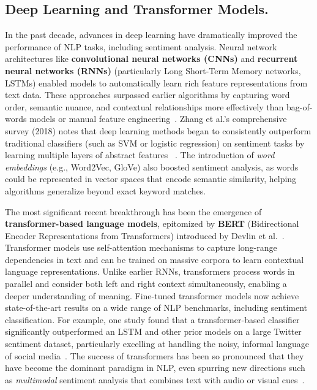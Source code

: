 \documentclass[12pt]{article}
\begin{document}
\subsection{Deep Learning and Transformer Models.}
In the past decade, advances in deep learning have dramatically improved the performance of NLP tasks,
including sentiment analysis. Neural network architectures like \textbf{convolutional neural networks (CNNs)}
and \textbf{recurrent neural networks (RNNs)} (particularly Long Short-Term Memory networks, LSTMs) enabled
models to automatically learn rich feature representations from text data. These approaches surpassed earlier
algorithms by capturing word order, semantic nuance, and contextual relationships more effectively than
bag-of-words models or manual feature engineering~\cite{10.1002/widm.1253}. Zhang et al.'s comprehensive
survey (2018) notes that deep learning methods began to consistently outperform traditional classifiers (such
as SVM or logistic regression) on sentiment tasks by learning multiple layers of abstract features~
\cite{10.1002/widm.1253}. The introduction of \textit{word embeddings} (e.g., Word2Vec, GloVe) also boosted
sentiment analysis, as words could be represented in vector spaces that encode semantic similarity, helping
algorithms generalize beyond exact keyword matches.

The most significant recent breakthrough has been the emergence of \textbf{transformer-based language models},
epitomized by \textbf{BERT} (Bidirectional Encoder Representations from Transformers) introduced by Devlin et
al.~\cite{devlin-etal-2019-bert}. Transformer models use self-attention mechanisms to capture long-range
dependencies in text and can be trained on massive corpora to learn contextual language representations.
Unlike earlier RNNs, transformers process words in parallel and consider both left and right context
simultaneously, enabling a deeper understanding of meaning. Fine-tuned transformer models now achieve
state-of-the-art results on a wide range of NLP benchmarks, including sentiment classification. For example,
one study found that a transformer-based classifier significantly outperformed an LSTM and other prior
models on a large Twitter sentiment dataset, particularly excelling at handling the noisy, informal language
of social media~\cite{10.1145/3650215.3650260}. The success of transformers has been so pronounced that they
have become the dominant paradigm in NLP, even spurring new directions such as \textit{multimodal} sentiment
analysis that combines text with audio or visual cues~\cite{10.1145/3586075}.
\end{document}
